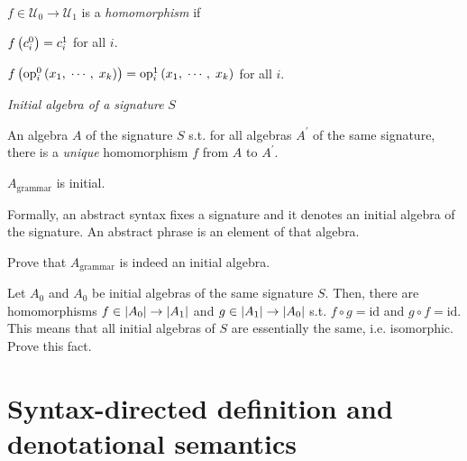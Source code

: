 \begin{enumcirc}
\begin{align*}
{		}
	\end{align*}
	\leavevmode
	$f \in \mathcal{U}_0 \rightarrow \mathcal{U}_1$ is a \emph{homomorphism} if
	\begin{enumrm}
		\item $f \left( c_i^0 \right) = c_i^1$ for all $i$.
		\item $f \left( \textrm{op}_i^0 \left( x_1,\; \cdots ,\; x_k \right) \right) =
			\textrm{op}_i^1 \left( x_1,\; \cdots ,\; x_k \right)$ for all $i$.
	\end{enumrm}

	\item
	\emph{Initial algebra of a signature} $S$
	\begin{enumrm}
		\item An algebra $A$ of the signature $S$ s.t. for all algebras $A^\prime$ of the
		same signature, there is a \emph{unique} homomorphism $f$ from $A$ to
		$A^\prime$.
		\item
		$A_{\textrm{grammar}}$ is initial.
		\item
		Formally, an abstract syntax fixes a signature and it denotes an initial
		algebra of the signature.
		An abstract phrase is an element of that algebra.
	\end{enumrm}

	\begin{exercise}
		Prove that $A_{\textrm{grammar}}$ is indeed an initial algebra.
	\end{exercise}

	\begin{exercise}
		Let $A_0$ and $A_0$ be initial algebras of the same signature $S$.
		Then, there are homomorphisms
		$f \in \left\vert A_0 \right\vert \rightarrow \left\vert A_1 \right\vert$ and
		$g \in \left\vert A_1 \right\vert \rightarrow \left\vert A_0 \right\vert$ s.t. $f \circ g = \textrm{id}$ and
		$g \circ f = \textrm{id}$.
		This means that all initial algebras of $S$ are essentially the same, i.e.
		isomorphic. Prove this fact.
	\end{exercise}

\end{enumcirc}

\section{Syntax-directed definition and denotational semantics}

